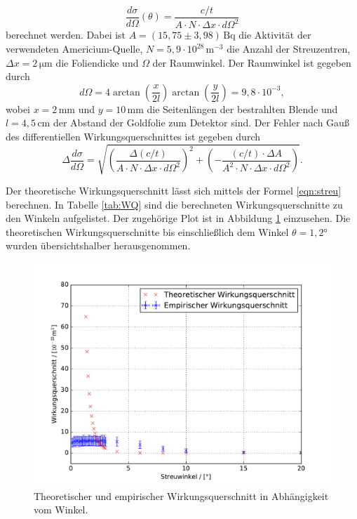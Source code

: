 \begin{equation}
  \frac{d\sigma}{d\Omega}(\theta) = \frac{c/t}{A\cdot{N}\cdot\Delta{x}\cdot d\Omega^2}
  \label{WQbla}
\end{equation}
berechnet werden.
Dabei ist $A = (15,75\pm3,98)\,\text{Bq}$ die Aktivität der verwendeten Americium-Quelle, $N = 5,9\cdot10^{28}\,\text{m}^{-3}$ die Anzahl der Streuzentren,
$\Delta{x} = 2\,\si{\micro\metre}$ die Foliendicke und $\Omega$ der Raumwinkel.
Der Raumwinkel ist gegeben durch
\begin{equation}
  d\Omega = 4\arctan\left( \frac{x}{2l} \right)\arctan\left( \frac{y}{2l} \right) = 9,8\cdot10^{-3},
\end{equation}
wobei $x = 2\,\text{mm}$ und $y=10\,\text{mm}$ die Seitenlängen der bestrahlten Blende und
$l = 4,5\,\text{cm}$ der Abstand der Goldfolie zum Detektor sind.
Der Fehler nach Gauß des differentiellen Wirkungsquerschnittes ist gegeben durch
\begin{equation}
  \Delta{\frac{d\sigma}{d\Omega}} = \sqrt{ \left(\frac{\Delta(c/t)}{A\cdot{N}\cdot\Delta{x}\cdot d\Omega^2}\right)^2 + \left( -\frac{(c/t)\cdot\Delta{A}}{A^2\cdot{N}\cdot\Delta{x}\cdot d\Omega^2} \right) }.
\end{equation}

Der theoretische Wirkungsquerschnitt lässt sich mittels der Formel \eqref{eqn:streu} berechnen.
In Tabelle \ref{tab:WQ} sind die berechneten Wirkungsquerschnitte zu den Winkeln aufgelistet.
Der zugehörige Plot ist in Abbildung \ref{fig:WQ} einzusehen.
Die theoretischen Wirkungsquerschnitte bis einschließlich dem Winkel $\theta = 1,2°$ wurden übersichtshalber herausgenommen.

\begin{figure}[H]
  \centering
  \includegraphics[width=\textwidth]{WQ.pdf}
  \caption{Theoretischer und empirischer Wirkungsquerschnitt in Abhängigkeit vom Winkel.}
  \label{fig:WQ}
\end{figure}


